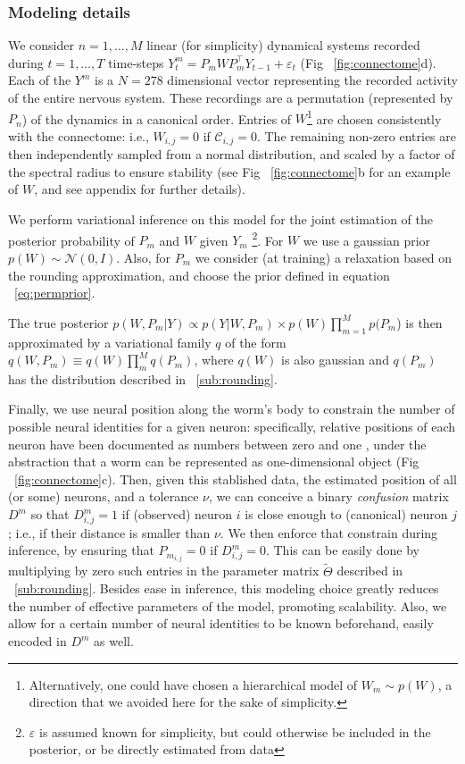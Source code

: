 \documentclass[twoside]{article}
\begin{document}
\subsubsection{Modeling details}
We consider $n=1,\ldots, M$ linear (for simplicity) dynamical systems recorded during $t=1,\ldots, T$ time-steps $Y^m_t=P_mWP_m^\top Y_{t-1}+\varepsilon_t$ (Fig ~\ref{fig:connectome}d). Each of the $Y^m$ is a $N=278$ dimensional vector representing the recorded activity of the entire nervous system. These recordings are a permutation (represented by $P_n$) of the dynamics in a canonical order.  Entries of $W$\footnote{Alternatively, one could have chosen a hierarchical model of $W_m\sim p(W)$, a direction that we avoided here for the sake of simplicity.} are chosen consistently with the connectome: i.e., $W_{i,j}=0$ if $\mathcal{C}_{i,j}=0$. The remaining non-zero entries are then independently sampled from a normal distribution, and scaled by a factor of the spectral radius to ensure stability (see Fig ~\ref{fig:connectome}b for an example of $W$, and see appendix for further details).

We perform variational inference on this model for the joint estimation of the posterior probability of $P_m$ and $W$ given  $Y_m$ \footnote{$\varepsilon$ is assumed known for simplicity, but could otherwise be included in the posterior, or be directly estimated from data}. For $W$ we use a gaussian prior $p(W)\sim \mathcal{N}(0, I)$. Also, for $P_m$ we consider (at training) a relaxation based on the rounding approximation, and choose the prior defined in equation ~\ref{eq:permprior}. 

The true posterior $p(W,P_m|Y)\propto p(Y|W,P_m)\times p(W)\prod_{m=1}^M p(P_m$) is then approximated by a variational family $q$ of the form $q(W,P_m)\equiv q(W)\prod_m^M q(P_m)$, where $q(W)$ is also gaussian and $q(P_m)$ has the distribution described in ~\ref{sub:rounding}. 

Finally, we use neural position along the worm's body to constrain the number of possible neural identities for a given neuron: specifically, relative positions of each neuron have been documented as numbers between zero and one \cite{white1986structure,wormatlas} , under the abstraction that a worm can be represented as one-dimensional object (Fig ~\ref{fig:connectome}c). Then, given this stablished data, the estimated position of all (or some) neurons, and a tolerance $\nu$, we can conceive a binary \textit{confusion} matrix $D^m$ so that $D^m_{i,j}=1$ if (observed) neuron $i$ is close enough to (canonical) neuron $j$; i.e., if their distance is smaller than $\nu$. We then enforce that constrain during inference, by ensuring that $P_{m_{i,j}}=0$ if $D^m_{i,j}=0$. This can be easily done by multiplying by zero such entries in the parameter matrix $\widetilde{\Theta}$ described in ~\ref{sub:rounding}. Besides ease in inference,  this modeling choice greatly reduces the number of effective parameters of the model, promoting scalability. Also, we allow for a certain number of neural identities to be known beforehand, easily encoded in $D^m$ as well.
\end{document}
